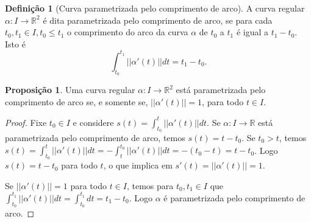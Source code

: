 \documentclass[12pt,leqno,twoside]{amsart}
\theoremstyle{definition}
\newtheorem{proposicao}{Proposição}[section]
\newtheorem{definicao}{Definição}[section]
\begin{document}
\vspace{0.2cm}

\begin{definicao}[Curva parametrizada pelo comprimento de arco]
	A curva regular $\alpha:I \to \mathbb{R}^2$ é dita parametrizada pelo comprimento de arco, se para cada $t_0 ,t_1 \in I, t_0\leq t_1$ o comprimento do arco da curva $\alpha$ de $t_0$ a $t_1$ é igual a $t_1-t_0$. Isto é $$\int_{t_0}^{t_1} ||\alpha'(t) || dt = t_1 - t_0.$$
\end{definicao}

\vspace{0.2cm}

\begin{proposicao}
	Uma curva regular $\alpha: I \to \mathbb{R}^2$ está parametrizada pelo comprimento de arco se, e somente se, $  ||\alpha'(t) || = 1$, para todo $t\in I$.
\end{proposicao}
\begin{proof}
	Fixe $t_0\in I$ e considere  $s(t) =\displaystyle\int_{t_0}^{t} || \alpha'(t) || dt$.  Se $\alpha:I\to \mathbb{R}$ está parametrizada pelo comprimento de arco,  temos $s(t) = t - t_0$. Se $t_0 >t $, temos $s(t) = \displaystyle\int_{t_0}^{t} ||\alpha'(t) || dt =  -\displaystyle \int_{t}^{t_0} ||\alpha'(t) || dt = -(t_0 - t) = t-t_0$. Logo $s(t) = t-t_0$ para todo $t$, o que implica em  $s'(t) = ||\alpha'(t)|| = 1$.

	Se $||\alpha'(t)|| = 1$ para todo $t\in I$, temos para $t_0, t_1 \in I$ que $\displaystyle \int_{t_0}^{t_1} ||\alpha'(t)||dt = \int_{t_0}^{t_1}dt = t_1 - t_0$. Logo $\alpha$ é parametrizada pelo comprimento de arco.
\end{proof}

\vspace{0.2cm}
\end{document}
